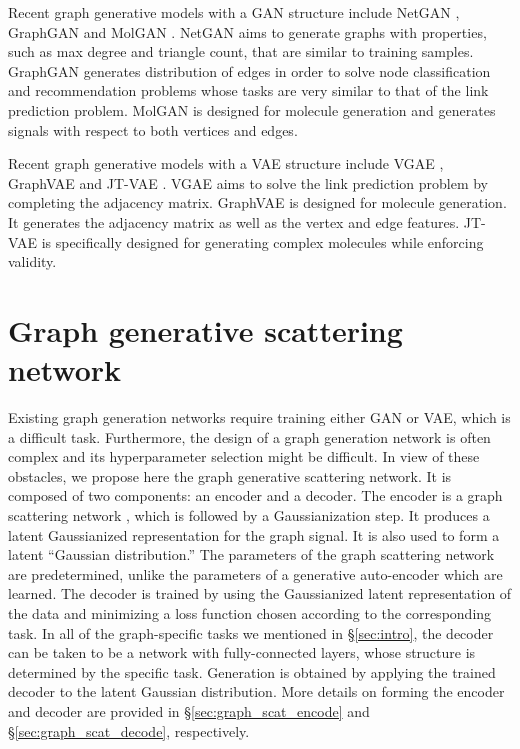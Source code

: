 \documentclass[conference]{IEEEtran}
\begin{document}
Recent graph generative models with a GAN structure include NetGAN \cite{bojchevski2018netgan}, GraphGAN \cite{wang2017graphgan} and MolGAN \cite{de2018molgan}. NetGAN aims to generate graphs with properties, such as max degree and triangle count, that are similar to training samples. GraphGAN generates distribution of edges in order to solve node classification and recommendation problems whose tasks are very similar to that of the link prediction problem. MolGAN is designed for molecule generation and generates signals with respect to both vertices and edges. 

Recent graph generative models with a VAE structure include VGAE \cite{kipf2016variational}, GraphVAE \cite{simonovsky2018graphvae} and JT-VAE \cite{jin2018junction}. VGAE aims to solve the link prediction problem by completing the adjacency matrix. GraphVAE is designed for molecule generation. It generates the adjacency matrix as well as the vertex and edge features. JT-VAE is specifically designed for generating complex molecules while enforcing validity. 




\section{Graph generative scattering network}\label{sec:scattering}

Existing graph generation networks require training either GAN or VAE, which is a difficult task. Furthermore, the design of a graph generation network is often complex \cite{bojchevski2018netgan, de2018molgan, jin2018junction} and its hyperparameter selection might be difficult. In view of these obstacles, we propose here the graph generative scattering network. It is composed of two components: an encoder and a decoder. The encoder is a graph scattering network \cite{zou2018graph}, which is followed by a Gaussianization step. It produces a latent Gaussianized representation for the graph signal. It is also used to form a latent {``}Gaussian distribution.{''} The parameters of the graph scattering network are predetermined, unlike the parameters of a generative auto-encoder which are learned. 
The decoder is trained by using the Gaussianized latent representation of the data and minimizing a loss function chosen according to the corresponding task. In all of the graph-specific tasks we mentioned in \S\ref{sec:intro}, the decoder can be taken to be a network with fully-connected layers, whose structure is determined by the specific task. Generation is obtained by applying the trained decoder to the latent Gaussian distribution. More details on forming the encoder and decoder are provided in \S\ref{sec:graph_scat_encode} and \S\ref{sec:graph_scat_decode}, respectively. 
\end{document}
